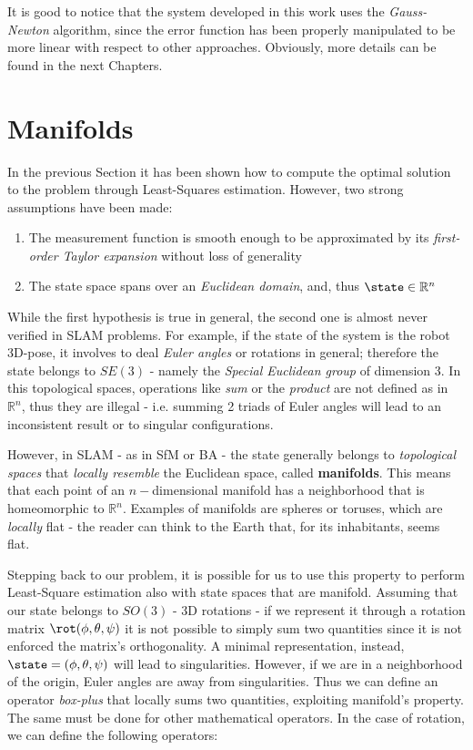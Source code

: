 It is good to notice that the system developed in this work uses the \textit{Gauss-Newton} algorithm, since the error function has been properly manipulated to be more linear with respect to other approaches. Obviously, more details can be found in the next Chapters.

\section{Manifolds}
In the previous Section it has been shown how to compute the optimal solution to the problem through Least-Squares estimation. However, two strong assumptions have been made:

\begin{enumerate}
    \item The measurement function is smooth enough to be approximated by its \textit{first-order Taylor expansion} without loss of generality
    \item The state space spans over an \textit{Euclidean domain}, and, thus $\state \in \mathbb{R}^n$
\end{enumerate}


\noindent While the first hypothesis is true in general, the second one is almost never verified in SLAM problems. For example, if the state of the system is the robot 3D-pose, it involves to deal \textit{Euler angles} or rotations in general; therefore the state belongs to $SE(3)$ - namely the \textit{Special Euclidean group} of dimension 3. In this topological spaces, operations like \textit{sum} or the \textit{product} are not defined as in $\mathbb{R}^n$, thus they are illegal - i.e. summing 2 triads of Euler angles will lead to an inconsistent result or to singular configurations.

However, in SLAM - as in SfM or BA - the state generally belongs to \textit{topological spaces} that \textit{locally resemble} the Euclidean space, called \textbf{manifolds}. This means that each point of an $n-$dimensional manifold has a neighborhood that is homeomorphic to $\mathbb{R}^n$. Examples of manifolds are spheres or toruses, which are \textit{locally} flat - the reader can think to the Earth that, for its inhabitants, seems flat.

Stepping back to our problem, it is possible for us to use this property to perform Least-Square estimation also with state spaces that are manifold. Assuming that our state belongs to $SO(3)$ - 3D rotations - if we represent it through a rotation matrix $\rot(\phi, \theta, \psi)$ it is not possible to simply sum two quantities since it is not enforced the matrix's orthogonality. A minimal representation, instead, $\state = (\phi, \theta, \psi)$ will lead to singularities. However, if we are in a neighborhood of the origin, Euler angles are away from singularities. Thus we can define an operator \textit{box-plus} that locally sums two quantities, exploiting manifold's property. The same must be done for other mathematical operators. In the case of rotation, we can define the following operators:

